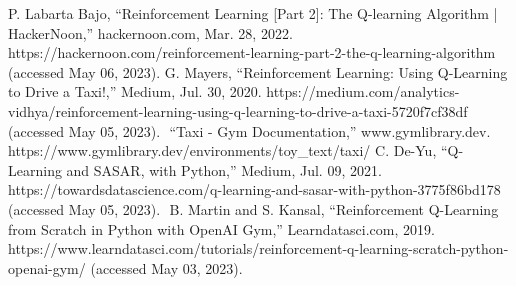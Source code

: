 \documentclass[conference]{IEEEtran}
\begin{document}
\begin{thebibliography}{00}
 P. Labarta Bajo, “Reinforcement Learning [Part 2]: The Q-learning Algorithm | HackerNoon,” hackernoon.com, Mar. 28, 2022. https://hackernoon.com/reinforcement-learning-part-2-the-q-learning-algorithm (accessed May 06, 2023).
 G. Mayers, “Reinforcement Learning: Using Q-Learning to Drive a Taxi!,” Medium, Jul. 30, 2020. https://medium.com/analytics-vidhya/reinforcement-learning-using-q-learning-to-drive-a-taxi-5720f7cf38df (accessed May 05, 2023).
‌ “Taxi - Gym Documentation,” www.gymlibrary.dev. https://www.gymlibrary.dev/environments/toy\_text/taxi/
 C. De-Yu, “Q-Learning and SASAR, with Python,” Medium, Jul. 09, 2021. https://towardsdatascience.com/q-learning-and-sasar-with-python-3775f86bd178 (accessed May 05, 2023).
‌ B. Martin and S. Kansal, “Reinforcement Q-Learning from Scratch in Python with OpenAI Gym,” Learndatasci.com, 2019. https://www.learndatasci.com/tutorials/reinforcement-q-learning-scratch-python-openai-gym/ (accessed May 03, 2023).
‌
\end{thebibliography}
\end{document}

